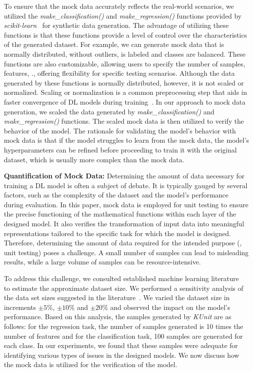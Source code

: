 To ensure that the mock data accurately reflects the real-world scenarios, we utilized the \textit{make\_classification()} and \textit{make\_regression()} functions provided by \textit{scikit-learn}~\cite{scikit} for synthetic data generation. 
The advantage of utilizing these functions is that these functions provide a level of control over the characteristics of the generated dataset.
For example, we can generate mock data that is normally distributed, without outliers, is labeled and classes are balanced. 
These functions are also customizable, allowing users to specify the number of samples, features, \etc., offering flexibility for specific testing scenarios.
Although the data generated by these functions is normally distributed, however, it is not scaled or normalized.
Scaling or normalization is a common preprocessing step that aids in faster convergence of DL models during training~\cite{LeCun12}.
In our approach to mock data generation, we scaled the data generated 
by \textit{make\_classification()} and \textit{make\_regression()} functions.
The scaled mock data is then utilized to verify the behavior of the model. 
The rationale for validating the model's behavior with mock data is that if the model struggles to learn from the mock data,
the model's hyperparameters can be refined before proceeding to train it with the original dataset, which is usually more complex than the mock data.

\textbf{Quantification of Mock Data:}
\label{quantificationdata}
Determining the amount of data necessary for training a DL model is often a subject of debate.
It is typically gauged by several factors, such as the complexity of the dataset and the model's performance during evaluation.
In this paper, mock data is employed for unit testing to ensure the precise functioning of the mathematical functions within each layer of the designed model. It also verifies the transformation of input data into meaningful representations tailored to the specific task for which the model is designed.
Therefore, determining the amount of data required for the intended purpose (\ie, unit testing) poses a challenge.
A small number of samples can lead to misleading results, while a large volume of samples can be resource-intensive.

To address this challenge, we consulted established machine learning literature~\cite{ruleof10,lakshmanan2020machine} to estimate the approximate dataset size. We performed a sensitivity analysis of the data set sizes suggested in the literature~\cite{ruleof10,lakshmanan2020machine}.
We varied the dataset size in increments $\pm5\%$, $\pm10\%$ and $\pm20\%$ and observed the impact on the model's performance. 
Based on this analysis, the samples generated by {\em KUnit} are as follows:
for the regression task, the number of samples generated is 10 times the number of features and for the classification task, 100 samples are generated for each class.
In our experiments, we found that these samples were adequate for identifying various types of issues in the designed models.
We now discuss how the mock data is utilized for the verification of the model.



